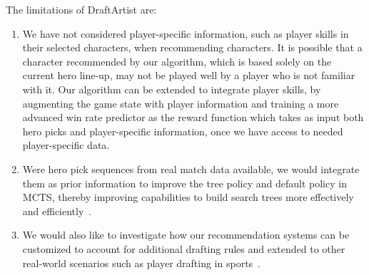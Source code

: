The limitations of DraftArtist are: 
\begin{enumerate}
\item We have not considered player-specific information, such as player skills in their selected characters, when recommending characters. It is possible that a character recommended by our algorithm, which is based solely on the current hero line-up, may not be played well by a player who is not familiar with it. Our algorithm can be extended to integrate player skills, by augmenting the game state with player information and training a more advanced win rate predictor as the reward function which takes as input both hero picks and player-specific information, once we have access to needed player-specific data.

\item Were hero pick sequences from real match data available, we would integrate them as prior information to improve the tree policy and default policy in MCTS, thereby improving capabilities to build search trees more effectively and efficiently~\cite{gelly2007combining,chaslot2009adding}. 
\item We would also like to investigate how our recommendation systems can be customized to account for additional drafting rules and extended to other real-world scenarios such as player drafting in sports~\cite{staw1995sunk}. 

\end{enumerate}

